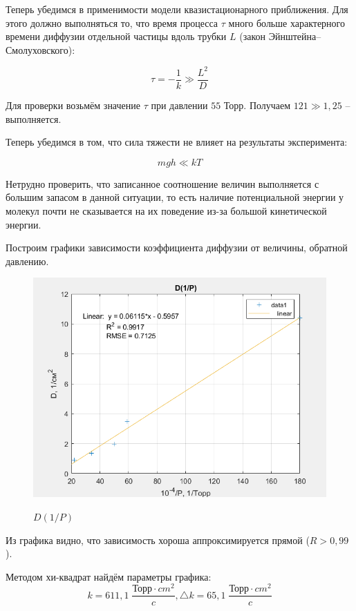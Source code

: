 \documentclass[a4paper, 12pt]{article} %
\begin{document}
Теперь убедимся в применимости модели квазистационарного приближения. Для этого должно выполняться то, что время процесса $\tau$ много больше характерного времени диффузии отдельной частицы вдоль трубки $L$ (закон Эйнштейна–Смолуховского):

\begin{equation}
	\tau = -\frac{1}{k} \gg \frac{L^2}{D}
\end{equation}

Для проверки возьмём значение $\tau$ при давлении $55$ Торр. Получаем $121 \gg 1,25$ -- выполняется. 

Теперь убедимся в том, что сила тяжести не влияет на результаты эксперимента:

\begin{equation}
	mgh \ll kT
\end{equation}

Нетрудно проверить, что записанное соотношение величин выполняется с большим запасом в данной ситуации, то есть наличие потенциальной энергии у молекул почти не сказывается на их поведение из-за большой кинетической энергии.

Построим графики зависимости коэффициента диффузии от величины, обратной давлению.

\begin{figure}[h]
    \centering
    \includegraphics[width = 10.5 cm]{res}
    \label{fig:vac}
    
    \begin{center}
		\caption{$D(1/P)$}
    \end{center}
\end{figure} 

Из графика видно, что зависимость хороша аппроксимируется прямой ($R > 0,99$). 

Методом хи-квадрат найдём параметры графика:
\begin{equation}
	k = 611,1 \; \frac{\text{Торр} \cdot cm^2}{c}, \triangle k = 65,1 \; \frac{\text{Торр} \cdot cm^2}{c} 
\end{equation}
\end{document}

